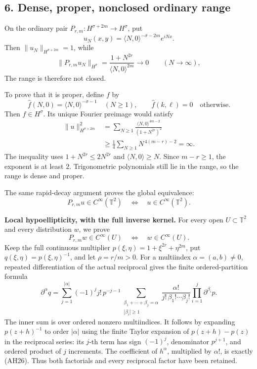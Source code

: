 \documentclass[
  11pt,
]{article}
\begin{document}
\subsection{6. Dense, proper, nonclosed ordinary
range}\label{dense-proper-nonclosed-ordinary-range}

On the ordinary pair \(P_{r,m}:H^{\sigma+2m}\to H^\sigma\), put \[
 u_N(x,y)=\langle N,0\rangle^{-\sigma-2m}e^{iNx}.
 \tag{AH17}
\] Then \(\|u_N\|_{H^{\sigma+2m}}=1\), while \[
 \|P_{r,m}u_N\|_{H^\sigma}
 =\frac{1+N^{2r}}{\langle N,0\rangle^{2m}}
 \longrightarrow0
 \qquad(N\to\infty),
 \tag{AH18}
\] The range is therefore not closed.

To prove that it is proper, define \(f\) by \[
 \widehat f(N,0)=\langle N,0\rangle^{-\sigma-1}
 \quad(N\geq1),\qquad
 \widehat f(k,\ell)=0\quad\text{otherwise}.
 \tag{AH19}
\] Then \(f\in H^\sigma\). Its unique Fourier preimage would satisfy \[
 \begin{aligned}
 \|u\|_{H^{\sigma+2m}}^2
 &=\sum_{N\geq1}
   \frac{\langle N,0\rangle^{4m-2}}
        {(1+N^{2r})^2}\\
 &\geq\frac14\sum_{N\geq1}
     N^{\,4(m-r)-2}
 =\infty .
 \end{aligned}
 \tag{AH20}
\] The inequality uses \(1+N^{2r}\leq2N^{2r}\) and
\(\langle N,0\rangle\geq N\). Since \(m-r\geq1\), the exponent is at
least \(2\). Trigonometric polynomials still lie in the range, so the
range is dense and proper.

The same rapid-decay argument proves the global equivalence: \[
 P_{r,m}u\in C^\infty(\mathbb T^2)
 \quad\Longleftrightarrow\quad
 u\in C^\infty(\mathbb T^2).
 \tag{AH21}
\]

\textbf{Local hypoellipticity, with the full inverse kernel.} For every
open \(U\subset\mathbb T^2\) and every distribution \(w\), we prove \[
 P_{r,m}w\in C^\infty(U)
       \quad\Longleftrightarrow\quad w\in C^\infty(U).
 \tag{AH25}
\] Keep the full continuous multiplier
\(p(\xi,\eta)=1+\xi^{2r}+\eta^{2m}\), put
\(q(\xi,\eta)=p(\xi,\eta)^{-1}\), and let \(\rho=r/m>0\). For a
multiindex \(\alpha=(a,b)\ne0\), repeated differentiation of the actual
reciprocal gives the finite ordered-partition formula \[
 \partial^\alpha q
 =\sum_{j=1}^{|\alpha|}(-1)^j j!\,p^{-j-1}
   \sum_{\substack{\beta_1+\cdots+\beta_j=\alpha\\|\beta_i|\geq1}}
    \frac{\alpha!}{j!\,\beta_1!\cdots\beta_j!}
    \prod_{i=1}^j\partial^{\beta_i}p .
 \tag{AH26}
\] The inner sum is over ordered nonzero multiindices. It follows by
expanding \(p(z+h)^{-1}\) to order \(|\alpha|\) using the finite Taylor
expansion of \(p(z+h)-p(z)\) in the reciprocal series: its \(j\)-th term
has sign \((-1)^j\), denominator \(p^{j+1}\), and ordered product of
\(j\) increments. The coefficient of \(h^\alpha\), multiplied by
\(\alpha!\), is exactly (AH26). Thus both factorials and every
reciprocal factor have been retained.
\end{document}
